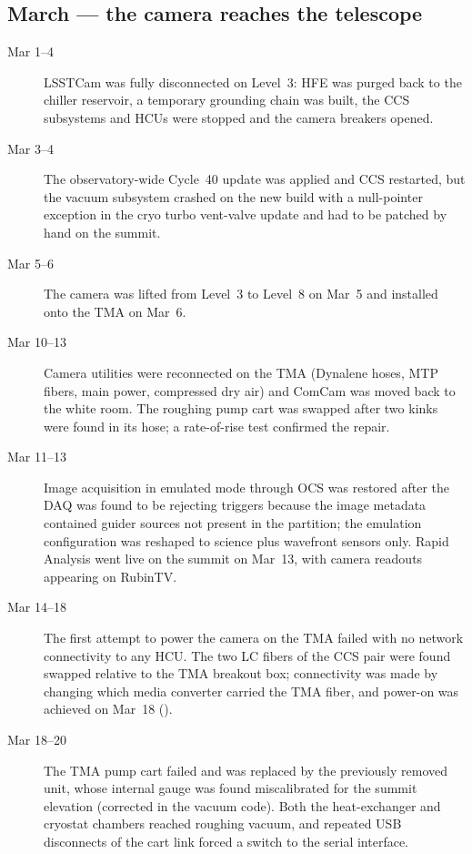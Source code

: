 \subsection{March --- the camera reaches the telescope}
\begin{description}
\item[Mar 1--4] LSSTCam was fully disconnected on Level~3: HFE was
  purged back to the chiller reservoir, a temporary grounding chain
  was built, the CCS subsystems and HCUs were stopped and the camera
  breakers opened.

\item[Mar 3--4] The observatory-wide Cycle~40 update was applied and
  CCS restarted, but the vacuum subsystem crashed on the new build
  with a null-pointer exception in the cryo turbo vent-valve update
  and had to be patched by hand on the summit.

\item[Mar 5--6] The camera was lifted from Level~3 to Level~8 on
  Mar~5 and installed onto the TMA on Mar~6.

\item[Mar 10--13] Camera utilities were reconnected on the TMA
  (Dynalene hoses, MTP fibers, main power, compressed dry air) and
  ComCam was moved back to the white room.  The roughing pump cart was
  swapped after two kinks were found in its hose; a rate-of-rise test
  confirmed the repair.

\item[Mar 11--13] Image acquisition in emulated mode through OCS was
  restored after the DAQ was found to be rejecting triggers because
  the image metadata contained guider sources not present in the
  partition; the emulation configuration was reshaped to science plus
  wavefront sensors only.  Rapid Analysis went live on the summit on
  Mar~13, with camera readouts appearing on RubinTV.

\item[Mar 14--18] The first attempt to power the camera on the TMA
  failed with no network connectivity to any HCU.  The two LC fibers
  of the CCS pair were found swapped relative to the TMA breakout box;
  connectivity was made by changing which media converter carried the
  TMA fiber, and power-on was achieved on Mar~18 ().

\item[Mar 18--20] The TMA pump cart failed and was replaced by the
  previously removed unit, whose internal gauge was found
  miscalibrated for the summit elevation (corrected in the vacuum
  code).  Both the heat-exchanger and cryostat chambers reached roughing
  vacuum, and repeated USB disconnects of the cart link forced a
  switch to the serial interface.


\end{description}
